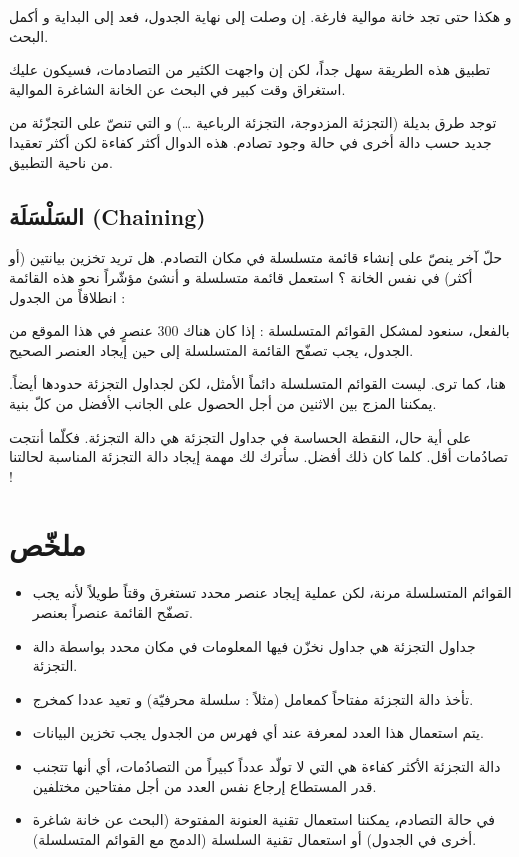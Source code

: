 و هكذا حتى تجد خانة موالية فارغة. إن وصلت إلى نهاية الجدول، فعد إلى البداية و أكمل البحث.

تطبيق هذه الطريقة سهل جداً، لكن إن واجهت الكثير من التصادمات، فسيكون عليك استغراق وقت كبير في البحث عن الخانة الشاغرة الموالية.

توجد طرق بديلة (التجزئة المزدوجة، التجزئة الرباعية \dots) و التي تنصّ على التجزّئة من جديد حسب دالة أخرى في حالة وجود تصادم. هذه الدوال أكثر كفاءة لكن أكثر تعقيدا من ناحية التطبيق.

\subsection{السَلْسَلَة (\textenglish{Chaining})}

حلّ آخر ينصّ على إنشاء قائمة متسلسلة في مكان التصادم. هل تريد تخزين بيانتين (أو أكثر) في نفس الخانة ؟ استعمل قائمة متسلسلة و أنشئ مؤشّراً نحو هذه القائمة انطلاقاً من الجدول :


بالفعل، سنعود لمشكل القوائم المتسلسلة : إذا كان هناك 300 عنصرٍ في هذا الموقع من الجدول، يجب تصفّح القائمة المتسلسلة إلى حين إيجاد العنصر الصحيح.

هنا، كما ترى. ليست القوائم المتسلسلة دائماً الأمثل، لكن لجداول التجزئة حدودها أيضاً. يمكننا المزج بين الاثنين من أجل الحصول على الجانب الأفضل من كلّ بنية.

على أية حال، النقطة الحساسة في جداول التجزئة هي دالة التجزئة. فكلّما أنتجت تصادُمات أقل. كلما كان ذلك أفضل.
سأترك لك مهمة إيجاد دالة التجزئة المناسبة لحالتنا !

\section*{ملخّص}

\begin{itemize}
	\item القوائم المتسلسلة مرنة، لكن عملية إيجاد عنصر محدد تستغرق وقتاً طويلاً لأنه يجب تصفّح القائمة عنصراً بعنصر.
	\item جداول التجزئة هي جداول نخزّن فيها المعلومات في مكان محدد بواسطة دالة التجزئة.
	\item تأخذ دالة التجزئة مفتاحاً كمعامل (مثلاً : سلسلة محرفيّة) و تعيد عددا كمخرج.
	\item يتم استعمال هذا العدد لمعرفة عند أي فهرس من الجدول يجب تخزين البيانات.
	\item دالة التجزئة الأكثر كفاءة هي التي لا تولّد عدداً كبيراً من التصادُمات، أي أنها تتجنب قدر المستطاع إرجاع نفس العدد من أجل مفتاحين مختلفين.
	\item في حالة التصادم، يمكننا استعمال تقنية العنونة المفتوحة (البحث عن خانة شاغرة أخرى في الجدول) أو استعمال تقنية السلسلة (الدمج مع القوائم المتسلسلة).
\end{itemize}

